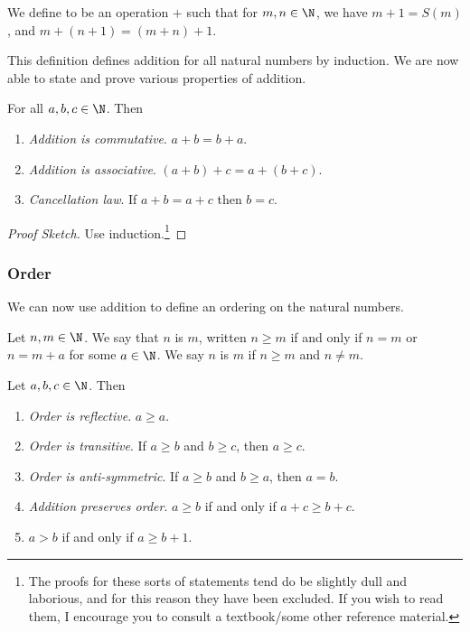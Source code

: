 \begin{definition}[Addition]
	We define  to be an operation $+$ such that for $m, n \in \N$, we have $m + 1 = S(m)$, and $m + (n + 1) = (m + n) + 1$.
\end{definition}

This definition defines addition for all natural numbers by induction. We are now able to state and prove various properties of addition.

\begin{proposition}
	For all $a, b, c \in \N$. Then
	\begin{enumerate}[label=(\roman*)]
		\item \emph{Addition is commutative}. $a + b = b + a$.
		\item \emph{Addition is associative}. $(a + b) + c = a + (b + c)$. 
		\item \emph{Cancellation law}. If $a + b = a + c$ then $b = c$.
	\end{enumerate}
\end{proposition}
\begin{proof}[Proof Sketch]
	Use induction.\footnote{The proofs for these sorts of statements tend do be slightly dull and laborious, and for this reason they have been excluded. If you wish to read them, I encourage you to consult a textbook/some other reference material.}
\end{proof}

\subsubsection{Order}

We can now use addition to define an ordering on the natural numbers.

\begin{definition}
	Let $n, m \in \N$. We say that $n$ is  $m$, written $n \geq m$ if and only if $n = m$ or $n = m + a$ for some $a \in \N$. We say $n$ is  $m$ if $n \geq m$ and $n \neq m$.
\end{definition}

\begin{proposition}
	Let $a, b, c \in \N$. Then
	\begin{enumerate}[label=(\roman*)]
		\item \emph{Order is reflective}. $a \geq a$.
		\item \emph{Order is transitive}. If $a \geq b$ and $b \geq c$, then $a \geq c$.
		\item \emph{Order is anti-symmetric}. If $a \geq b$ and $b \geq a$, then $a = b$.
		\item \emph{Addition preserves order}. $a \geq b$ if and only if $a + c \geq b + c$.
		\item $a > b$ if and only if $a \geq b + 1$.
	\end{enumerate}
\end{proposition}

